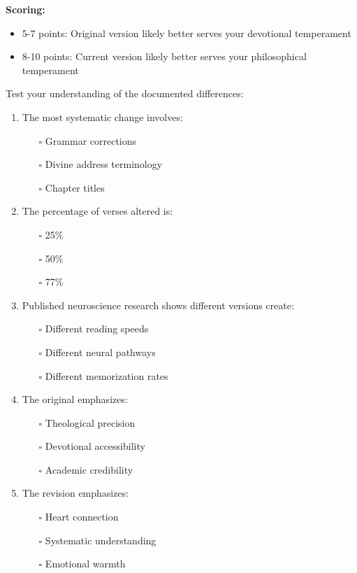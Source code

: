 \documentclass[12pt,twoside]{book}
\begin{document}
\textbf{\textbf{Scoring:}}
\begin{itemize}
\item 5-7 points: Original version likely better serves your devotional temperament
\item 8-10 points: Current version likely better serves your philosophical temperament
\end{itemize}

Test your understanding of the documented differences:

\begin{enumerate}
\item The most systematic change involves:
\begin{itemize}
\item[{$\square$}] Grammar corrections
\item[{$\square$}] Divine address terminology
\item[{$\square$}] Chapter titles
\end{itemize}

\item The percentage of verses altered is:
\begin{itemize}
\item[{$\square$}] 25\%
\item[{$\square$}] 50\%
\item[{$\square$}] 77\%
\end{itemize}

\item Published neuroscience research shows different versions create:
\begin{itemize}
\item[{$\square$}] Different reading speeds
\item[{$\square$}] Different neural pathways
\item[{$\square$}] Different memorization rates
\end{itemize}

\item The original emphasizes:
\begin{itemize}
\item[{$\square$}] Theological precision
\item[{$\square$}] Devotional accessibility
\item[{$\square$}] Academic credibility
\end{itemize}

\item The revision emphasizes:
\begin{itemize}
\item[{$\square$}] Heart connection
\item[{$\square$}] Systematic understanding
\item[{$\square$}] Emotional warmth
\end{itemize}
\end{enumerate}
\end{document}

